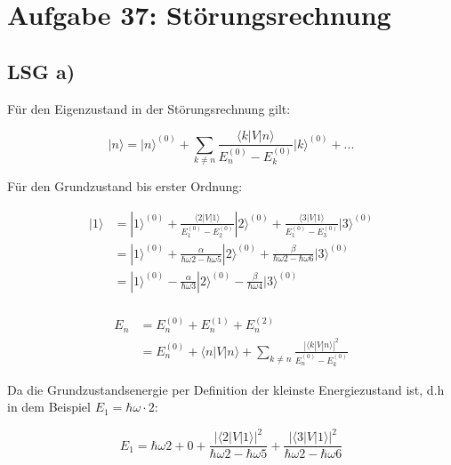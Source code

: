 \documentclass[10pt,a4paper,oneside,fleqn]{scrbook}
\begin{document}
\section*{Aufgabe 37: Störungsrechnung}



\subsection*{LSG a)}

Für den Eigenzustand in der Störungsrechnung gilt:

\[ |n\rangle = |n\rangle ^{(0)}+\sum_{k\neq n} \frac{\langle k|V|n\rangle }{E_n^{(0)}- E_k^{(0)}}|k\rangle ^{(0)} + ... \]

Für den Grundzustand bis erster Ordnung:

\begin{align} 
|1\rangle &= |1\rangle ^{(0)}+\frac{\langle 2|V|1\rangle }{E_1^{(0)}- E_2^{(0)}}|2\rangle ^{(0)} +  \frac{\langle 3|V|1\rangle }{E_1^{(0)}- E_3^{(0)}}|3\rangle ^{(0)} \\
&= |1\rangle ^{(0)}+\frac{\alpha }{\hbar\omega 2- \hbar\omega 5}|2\rangle ^{(0)} +  \frac{\beta }{\hbar\omega 2- \hbar\omega 6}|3\rangle ^{(0)} \\
&= |1\rangle ^{(0)}-\frac{\alpha }{\hbar\omega 3}|2\rangle ^{(0)} -  \frac{\beta }{\hbar\omega 4}|3\rangle ^{(0)} \\
\end{align}

\begin{align}
E_n &= E_n^{(0)}+ E_n^{(1)}+E_n^{(2)} \\
&=E_n^{(0)} + \langle n|V|n\rangle + \sum_{k\neq n}\frac{|\langle
  k|V|n\rangle|^2}{E_n^{(0)}- E_k^{(0)}}
\end{align}

Da die Grundzustandsenergie per Definition der kleinste Energiezustand ist, d.h in dem Beispiel \(E_1=\hbar\omega\cdot 2\):


\[E_1 = \hbar\omega 2 + 0 +  \frac{|\langle 2|V|1\rangle|^2}{\hbar\omega 2
  -\hbar\omega 5  } + \frac{|\langle 3|V|1\rangle|^2}{\hbar\omega 2
  -\hbar\omega 6  } \]
\end{document}
